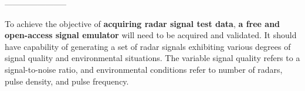 -----------------------

To achieve the objective of \textbf{acquiring radar signal test data}, \textbf{a free and open-access signal emulator} will need to be acquired and validated. 
It should have capability of  generating a set of radar signals exhibiting various degrees of signal quality and environmental situations. 
The variable signal quality refers to a signal-to-noise ratio, and environmental conditions refer to number of radars, pulse density, and pulse frequency.
